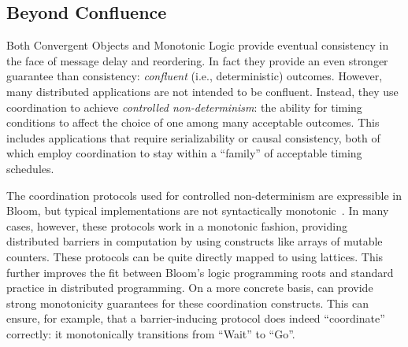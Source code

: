 \subsection{Beyond Confluence}
Both Convergent Objects and Monotonic Logic provide eventual consistency in the face of message delay and reordering.  In fact they provide an even stronger guarantee than consistency: {\em confluent} (i.e., deterministic) outcomes.  However, many distributed applications are not intended to be confluent.  Instead, they use coordination to achieve {\em controlled non-determinism}: the ability for timing conditions to affect the choice of one among many acceptable outcomes. This includes applications that require serializability or causal consistency, both of which employ coordination to stay within a ``family'' of acceptable timing schedules.  

The coordination protocols used for controlled non-determinism are expressible in Bloom, but typical implementations are not syntactically monotonic~\cite{Alvaro2011}.  In many cases, however, these protocols work in a monotonic fashion, providing distributed barriers in computation by using constructs like arrays of mutable counters.  These protocols can be quite directly mapped to \lang using lattices.  This further improves the fit between Bloom's logic programming roots and standard practice in distributed programming.  On a more concrete basis, \lang can provide strong monotonicity guarantees for these coordination constructs.  This can ensure, for example, that a barrier-inducing protocol does indeed ``coordinate'' correctly: it monotonically transitions from ``Wait'' to ``Go''.

